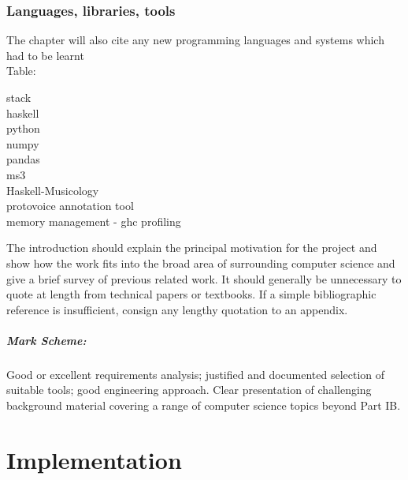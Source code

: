\documentclass[12pt,a4paper,twoside,openright]{report}
\begin{document}
\subsection{Languages, libraries, tools}
The chapter will also cite any new programming languages and systems which had to be learnt \\
Table: 
\par 
stack  \\
haskell \\ 
python \\
numpy \\ 
pandas \\ 
ms3 \\
Haskell-Musicology \\ 
protovoice annotation tool \\
memory management - ghc profiling \\
\par
The introduction should explain the principal motivation for the project and show how the work fits into the broad area of surrounding computer science and give a brief survey of previous related work.
It should generally be unnecessary to quote at length from technical papers or textbooks.
If a simple bibliographic reference is insufficient, consign any lengthy quotation to an appendix.

\paragraph{Mark Scheme: }
Good or excellent requirements analysis; justified and documented selection of suitable tools; good engineering approach.
Clear presentation of challenging background material covering a range of computer science topics beyond Part IB.


\chapter{Implementation}
\end{document}
